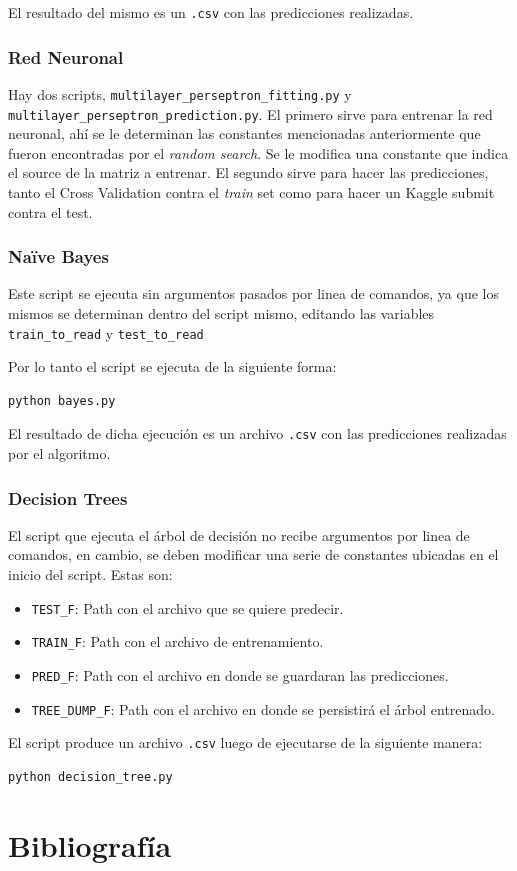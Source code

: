 \documentclass[10pt,a4paper]{article}
\begin{document}
El resultado del mismo es un \texttt{.csv} con las predicciones realizadas.

\subsubsection{Red Neuronal}
Hay dos scripts, \texttt{multilayer\_perseptron\_fitting.py} y \texttt{multilayer\_perseptron\_prediction.py}. El primero sirve para entrenar la red neuronal, ahí se le determinan las constantes mencionadas anteriormente que fueron encontradas por el \textit{random search}. Se le modifica una constante que indica el source de la matriz a entrenar. El segundo sirve para hacer las predicciones, tanto el Cross Validation contra el \textit{train} set como para hacer un Kaggle submit contra el test.

\subsubsection{Naïve Bayes}
Este script se ejecuta sin argumentos pasados por linea de comandos, ya que los mismos se determinan dentro del script mismo, editando las variables \texttt{train\_to\_read} y \texttt{test\_to\_read}

Por lo tanto el script se ejecuta de la siguiente forma:

\begin{lstlisting}
python bayes.py
\end{lstlisting}

El resultado de dicha ejecución es un archivo \texttt{.csv} con las predicciones realizadas por el algoritmo.

\subsubsection{Decision Trees}
El script que ejecuta el árbol de decisión no recibe argumentos por linea de comandos, en cambio, se deben modificar una serie de constantes ubicadas en el inicio del script. Estas son:

\begin{itemize}
    \item \texttt{TEST\_F}: Path con el archivo que se quiere predecir.
    \item \texttt{TRAIN\_F}: Path con el archivo de entrenamiento.
    \item \texttt{PRED\_F}: Path con el archivo en donde se guardaran las predicciones.
    \item \texttt{TREE\_DUMP\_F}: Path con el archivo en donde se persistirá el árbol entrenado.
\end{itemize}

El script produce un archivo \texttt{.csv} luego de ejecutarse de la siguiente manera:

\begin{lstlisting}
python decision_tree.py
\end{lstlisting}

\pagebreak

\section{Bibliografía}


\end{document}
